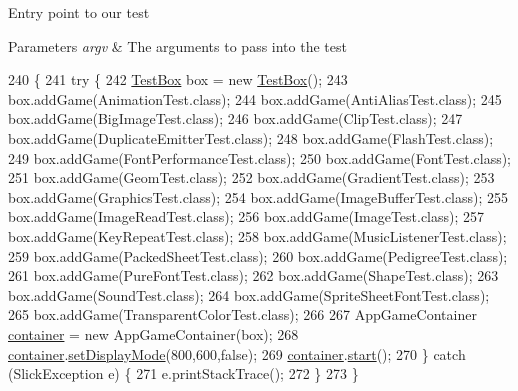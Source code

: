 Entry point to our test


\begin{DoxyParams}{Parameters}
{\em argv} & The arguments to pass into the test \\
\hline
\end{DoxyParams}

\begin{DoxyCode}
240                                            \{
241         \textcolor{keywordflow}{try} \{
242             \mbox{\hyperlink{classorg_1_1newdawn_1_1slick_1_1tests_1_1_test_box_a640adeac1eced619cbe249beb5d57058}{TestBox}} box = \textcolor{keyword}{new} \mbox{\hyperlink{classorg_1_1newdawn_1_1slick_1_1tests_1_1_test_box_a640adeac1eced619cbe249beb5d57058}{TestBox}}();
243             box.addGame(AnimationTest.class);
244             box.addGame(AntiAliasTest.class);
245             box.addGame(BigImageTest.class);
246             box.addGame(ClipTest.class);
247             box.addGame(DuplicateEmitterTest.class);
248             box.addGame(FlashTest.class);
249             box.addGame(FontPerformanceTest.class);
250             box.addGame(FontTest.class);
251             box.addGame(GeomTest.class);
252             box.addGame(GradientTest.class);
253             box.addGame(GraphicsTest.class);
254             box.addGame(ImageBufferTest.class);
255             box.addGame(ImageReadTest.class);
256             box.addGame(ImageTest.class);
257             box.addGame(KeyRepeatTest.class);
258             box.addGame(MusicListenerTest.class);
259             box.addGame(PackedSheetTest.class);
260             box.addGame(PedigreeTest.class);
261             box.addGame(PureFontTest.class);
262             box.addGame(ShapeTest.class);
263             box.addGame(SoundTest.class);
264             box.addGame(SpriteSheetFontTest.class);
265             box.addGame(TransparentColorTest.class);
266             
267             AppGameContainer \mbox{\hyperlink{classorg_1_1newdawn_1_1slick_1_1tests_1_1_test_box_a686d64440b8b2323907a6c4641669c60}{container}} = \textcolor{keyword}{new} AppGameContainer(box);
268             \mbox{\hyperlink{classorg_1_1newdawn_1_1slick_1_1tests_1_1_test_box_a686d64440b8b2323907a6c4641669c60}{container}}.\mbox{\hyperlink{classorg_1_1newdawn_1_1slick_1_1_app_game_container_aa2de68db61ddd3917a8edc0177ebdfe3}{setDisplayMode}}(800,600,\textcolor{keyword}{false});
269             \mbox{\hyperlink{classorg_1_1newdawn_1_1slick_1_1tests_1_1_test_box_a686d64440b8b2323907a6c4641669c60}{container}}.\mbox{\hyperlink{classorg_1_1newdawn_1_1slick_1_1_app_game_container_adcadc0e560e64d03be24c817931fdd54}{start}}();
270         \} \textcolor{keywordflow}{catch} (SlickException e) \{
271             e.printStackTrace();
272         \}
273     \}
\end{DoxyCode}
\mbox{\label{classorg_1_1newdawn_1_1slick_1_1tests_1_1_test_box_a293c3589092e888da58b49b41fb591fd}} 
